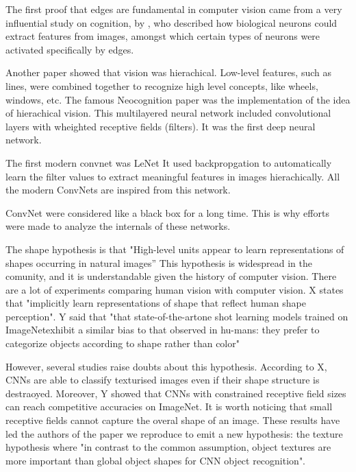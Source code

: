 \documentclass{article}
\begin{document}
\noindent
The first proof that edges are fundamental in computer vision came from a very influential study on cognition, 
by \cite{hubel1959receptive}, who described how biological neurons could extract features from images,
amongst which certain types of neurons were activated specifically by edges. \smallskip



\noindent
Another paper showed that vision was hierachical. Low-level features, such as lines,
were combined together to recognize high level concepts, like wheels, windows, etc. 
The famous Neocognition paper \cite{neocognitron} was the implementation of the idea of hierachical vision.
This multilayered neural network included convolutional layers with wheighted receptive fields (filters).
It was the first deep neural network.

The first modern convnet was LeNet \cite{Lecun98gradient-basedlearning}
It used backpropgation to automatically learn the filter values to extract meaningful features in images hierachically.
All the modern ConvNets are inspired from this network.

ConvNet were considered like a black box for a long time.
This is why efforts were made to analyze the internals of these networks.

The shape hypothesis is that "High-level units appear to learn
representations of shapes occurring in natural images” \cite{Kriegeskorte029876}
This hypothesis is widespread in the comunity, and
it is understandable given the history of computer vision.
There are a lot of experiments comparing human vision with computer vision.
X states that "implicitly learn representations of shape
 that reflect human shape perception".
Y said that "that  state-of-the-artone  shot  learning  models  trained  on  ImageNetexhibit  a  similar  bias  to  that  observed  in  hu-mans:  
they prefer to categorize objects according  to  shape  rather  than  color" \cite{ritter2017cognitive}

However, several studies raise doubts about this hypothesis.
According to X, CNNs are able to classify texturised images even if their shape structure is destraoyed.
Moreover, Y showed that CNNs with constrained receptive field sizes can reach competitive accuracies on ImageNet.
It is worth noticing that small receptive fields cannot capture the overal shape of an image.
These results have led the authors of the paper we reproduce \cite{geirhos2018imagenettrained} 
to emit a new hypothesis: the texture hypothesis where "in contrast to the
common assumption, object textures are more important than global object shapes for CNN object
recognition".
\end{document}
